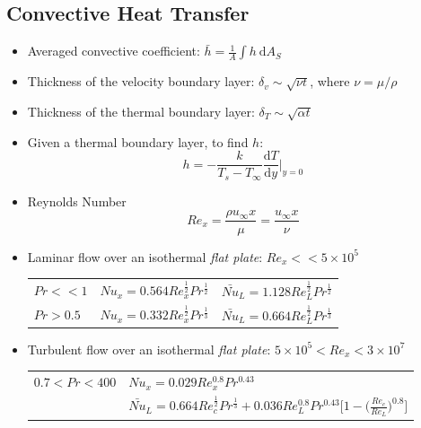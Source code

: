 \documentclass[11pt,a4paper]{article}
\begin{document}
\subsection{Convective Heat Transfer}
\begin{itemize}
    \item Averaged convective coefficient: $\displaystyle \bar{h}=\frac{1}{A}\int h \ \mathrm{d}A_{S}$
    
    \item Thickness of the velocity boundary layer: $\delta_{v} \sim \sqrt{\nu t}$, where $\nu=\mu/\rho$
    
    \item Thickness of the thermal boundary layer: $\delta_{T} \sim \sqrt{\alpha t}$
    
    \item Given a thermal boundary layer, to find $h$:
    \[
        h=-\frac{k}{T_{s}-T_{\infty}}\frac{\mathrm{d}T}{\mathrm{d}y}\bigg\rvert_{y=0} 
    \]
    
    \item Reynolds Number 
    \[
        Re_{x} = \frac{\rho u_{\infty} x}{\mu}=\frac{u_{\infty}x}{\nu}
    \]

    \item Laminar flow over an isothermal \textit{flat plate}: $Re_{x}<<5\times 10^{5}$\\
    \begin{center}
    \begin{tabular}{lcc}
        $Pr<<1$ & $Nu_{x} = 0.564Re_{x}^{\frac{1}{2}}Pr^{\frac{1}{2}}$  & $\bar{Nu}_{L} =1.128Re_{L}^{\frac{1}{2}}Pr^{\frac{1}{2}}$\\ [1.3ex]  
        $Pr>0.5$ &  $Nu_{x} = 0.332Re_{x}^{\frac{1}{2}}Pr^{\frac{1}{3}}$ &   $\bar{Nu}_{L} =0.664Re_{L}^{\frac{1}{2}}Pr^{\frac{1}{3}}$ 
    \end{tabular}
    \end{center}
    
    \item Turbulent flow over an isothermal \textit{flat plate}: $5\times 10^{5}<Re_{x}<3\times 10^{7}$
    \begin{center}
    \begin{tabular}{l l}
        $0.7<Pr<400$ & $\displaystyle Nu_{x}=0.029Re_{x}^{0.8}Pr^{0.43}$\\
        & $\displaystyle \bar{Nu}_{L}=0.664Re_{c}^{\frac{1}{2}}Pr^{\frac{1}{3}}+0.036Re_{L}^{0.8}Pr^{0.43}\bigg[1-\bigg(\frac{Re_{c}}{Re_{L}}\bigg)^{0.8}\bigg]$
    \end{tabular}
    \end{center}


\end{itemize}
\end{document}
